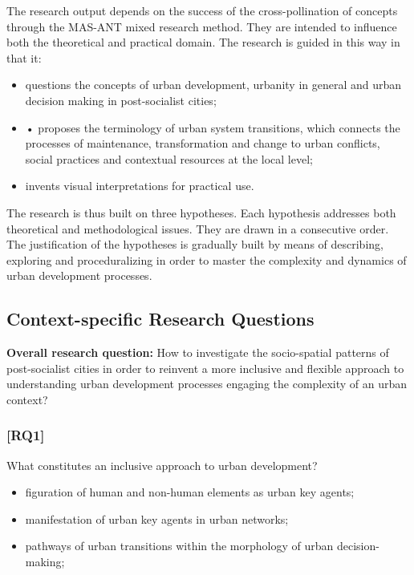 \documentclass[11pt]{report}
\begin{document}
The research output depends on the success of the cross-pollination of concepts through the MAS-ANT mixed research method. They are intended to influence both the theoretical and practical domain. The research is guided in this way in that it:
\begin{itemize}
\item questions the concepts of urban development, urbanity in general and urban decision making in post-socialist cities;
\item •	proposes the terminology of urban system transitions, which connects the processes of maintenance, transformation and change to urban conflicts, social practices and contextual resources at the local level;
\item invents visual interpretations for practical use.
\end{itemize}

The research is thus built on three hypotheses. Each hypothesis addresses both theoretical and methodological issues. They are drawn in a consecutive order. The justification of the hypotheses is gradually built by means of describing, exploring and proceduralizing in order to master the complexity and dynamics of urban development processes. 

\subsection{Context-specific Research Questions}

\textbf{Overall research question:} How to investigate the socio-spatial patterns of post-socialist cities in order to reinvent a more inclusive and flexible approach to understanding urban development processes engaging the complexity of an urban context? 

\subsubsection{[RQ1]}
What constitutes an inclusive approach to urban development?
\begin{itemize}
\item figuration of human and non-human elements as urban key agents;
\item manifestation of urban key agents in urban networks;
\item pathways of urban transitions within the morphology of urban decision-making;
\end {itemize}
\end{document}
